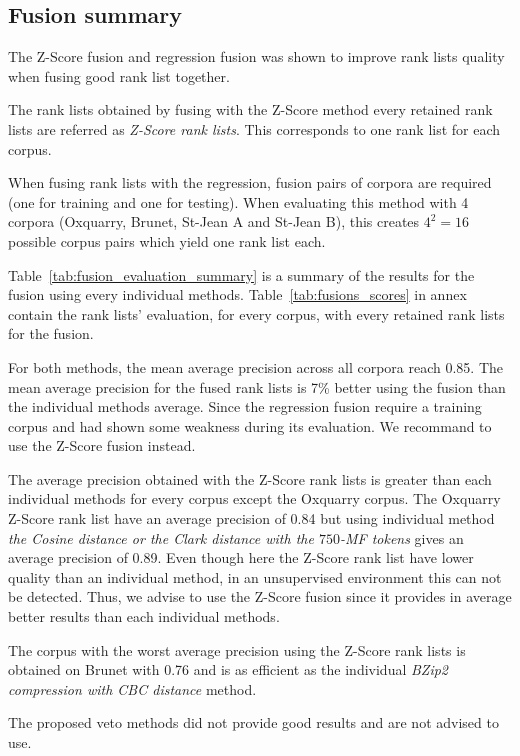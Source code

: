 \subsection{Fusion summary}

The Z-Score fusion and regression fusion was shown to improve rank lists quality when fusing good rank list together.

The rank lists obtained by fusing with the Z-Score method every retained rank lists are referred as \textit{Z-Score rank lists}.
This corresponds to one rank list for each corpus.

When fusing rank lists with the regression, fusion pairs of corpora are required (one for training and one for testing).
When evaluating this method with 4 corpora (Oxquarry, Brunet, St-Jean A and St-Jean B), this creates $4^2 = 16$ possible corpus pairs which yield one rank list each.

Table~\ref{tab:fusion_evaluation_summary} is a summary of the results for the fusion using every individual methods.
Table~\ref{tab:fusions_scores} in annex contain the rank lists' evaluation, for every corpus, with every retained rank lists for the fusion.

For both methods, the mean average precision across all corpora reach 0.85.
The mean average precision for the fused rank lists is 7\% better using the fusion than the individual methods average.
Since the regression fusion require a training corpus and had shown some weakness during its evaluation.
We recommand to use the Z-Score fusion instead.

The average precision obtained with the Z-Score rank lists is greater than each individual methods for every corpus except the Oxquarry corpus.
The Oxquarry Z-Score rank list have an average precision of 0.84 but using individual method \textit{the Cosine distance or the Clark distance with the $750$-MF tokens} gives an average precision of 0.89.
Even though here the Z-Score rank list have lower quality than an individual method, in an unsupervised environment this can not be detected.
Thus, we advise to use the Z-Score fusion since it provides in average better results than each individual methods.

The corpus with the worst average precision using the Z-Score rank lists is obtained on Brunet with 0.76 and is as efficient as the individual \textit{BZip2 compression with CBC distance} method.

The proposed veto methods did not provide good results and are not advised to use.

